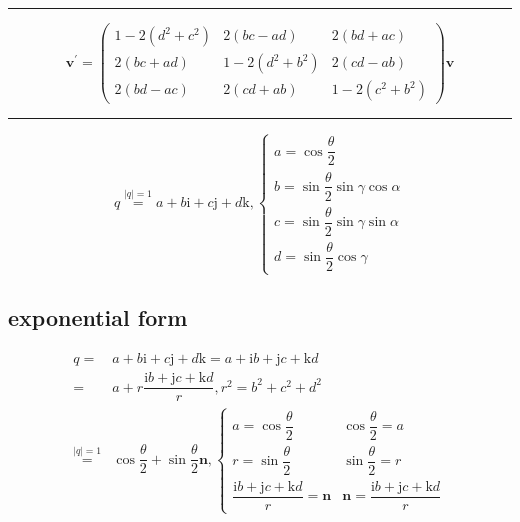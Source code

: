 \documentclass[
]{book}
\theoremstyle{definition}
\theoremstyle{definition}
\theoremstyle{definition}
\theoremstyle{definition}
\theoremstyle{remark}
\begin{document}
\begin{center}\rule{0.5\linewidth}{0.5pt}\end{center}

\[
\boldsymbol{v}^{\prime}=\begin{pmatrix}1-2\left(d^{2}+c^{2}\right) & 2\left(bc-ad\right) & 2\left(bd+ac\right)\\
2\left(bc+ad\right) & 1-2\left(d^{2}+b^{2}\right) & 2\left(cd-ab\right)\\
2\left(bd-ac\right) & 2\left(cd+ab\right) & 1-2\left(c^{2}+b^{2}\right)
\end{pmatrix}\boldsymbol{v}
\]

\begin{center}\rule{0.5\linewidth}{0.5pt}\end{center}

\[
q\overset{\left|q\right|=1}{=}a+b\mathrm{i}+c\mathrm{j}+d\mathrm{k},\begin{cases}
a=\cos\dfrac{\theta}{2}\\
b=\sin\dfrac{\theta}{2}\sin\gamma\cos\alpha\\
c=\sin\dfrac{\theta}{2}\sin\gamma\sin\alpha\\
d=\sin\dfrac{\theta}{2}\cos\gamma
\end{cases}
\]

\subsection{exponential form}\label{exponential-form}

\[
\begin{aligned}
q= & a+b\mathrm{i}+c\mathrm{j}+d\mathrm{k}=a+\mathrm{i}b+\mathrm{j}c+\mathrm{k}d\\
= & a+r\dfrac{\mathrm{i}b+\mathrm{j}c+\mathrm{k}d}{r},r^{2}=b^{2}+c^{2}+d^{2}\\
\overset{\left|q\right|=1}{=} & \cos\dfrac{\theta}{2}+\sin\dfrac{\theta}{2}\boldsymbol{n},\begin{cases}
a=\cos\dfrac{\theta}{2} & \cos\dfrac{\theta}{2}=a\\
r=\sin\dfrac{\theta}{2} & \sin\dfrac{\theta}{2}=r\\
\dfrac{\mathrm{i}b+\mathrm{j}c+\mathrm{k}d}{r}=\boldsymbol{n} & \boldsymbol{n}=\dfrac{\mathrm{i}b+\mathrm{j}c+\mathrm{k}d}{r}
\end{cases}
\end{aligned}
\]
\end{document}
